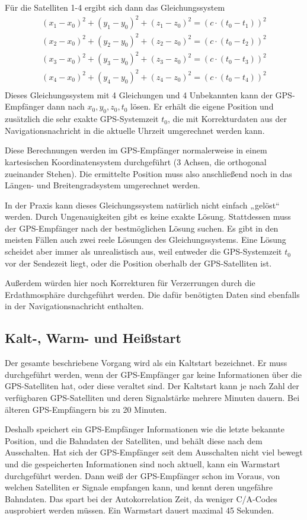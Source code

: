 \documentclass[12pt,a4paper]{scrartcl}
\begin{document}
Für die Satelliten 1-4 ergibt sich dann das Gleichungssystem
\begin{align*}
(x_1 - x_0)^2 + (y_1 - y_0)^2 + (z_1 - z_0)^2 = (c\cdot(t_0-t_1))^2 \\
(x_2 - x_0)^2 + (y_2 - y_0)^2 + (z_2 - z_0)^2 = (c\cdot(t_0-t_2))^2 \\
(x_3 - x_0)^2 + (y_3 - y_0)^2 + (z_3 - z_0)^2 = (c\cdot(t_0-t_3))^2 \\
(x_4 - x_0)^2 + (y_4 - y_0)^2 + (z_4 - z_0)^2 = (c\cdot(t_0-t_4))^2 \\
\end{align*}
Dieses Gleichungssystem mit 4 Gleichungen und 4 Unbekannten kann der GPS-Empfänger dann nach $x_0,y_0,z_0,t_0$ lösen. Er erhält die eigene Position und zusätzlich die sehr exakte GPS-Systemzeit $t_0$, die mit Korrekturdaten aus der Navigationsnachricht in die aktuelle Uhrzeit umgerechnet werden kann.

Diese Berechnungen werden im GPS-Empfänger normalerweise in einem kartesischen Koordinatensystem durchgeführt (3 Achsen, die orthogonal zueinander Stehen). Die ermittelte Position muss also anschließend noch in das Längen- und Breitengradsystem umgerechnet werden.

In der Praxis kann dieses Gleichungssystem natürlich nicht einfach „gelöst“ werden. Durch Ungenauigkeiten gibt es keine exakte Lösung. Stattdessen muss der GPS-Empfänger nach der bestmöglichen Lösung suchen. Es gibt in den meisten Fällen auch zwei reele Lösungen des Gleichungssystems. Eine Lösung scheidet aber immer als unrealistisch aus, weil entweder die GPS-Systemzeit $t_0$ vor der Sendezeit liegt, oder die Position oberhalb der GPS-Satelliten ist.

Außerdem würden hier noch Korrekturen für Verzerrungen durch die Erdathmosphäre durchgeführt werden. Die dafür benötigten Daten sind ebenfalls in der Navigationsnachricht enthalten.

\subsection{Kalt-, Warm- und Heißstart}
Der gesamte beschriebene Vorgang wird als ein Kaltstart bezeichnet. Er muss durchgeführt werden, wenn der GPS-Empfänger gar keine Informationen über die GPS-Satelliten hat, oder diese veraltet sind. Der Kaltstart kann je nach Zahl der verfügbaren GPS-Satelliten und deren Signalstärke mehrere Minuten dauern. Bei älteren GPS-Empfängern bis zu 20 Minuten.

Deshalb speichert ein GPS-Empfänger Informationen wie die letzte bekannte Position, und die Bahndaten der Satelliten, und behält diese nach dem Ausschalten. Hat sich der GPS-Empfänger seit dem Ausschalten nicht viel bewegt und die gespeicherten Informationen sind noch aktuell, kann ein Warmstart durchgeführt werden. Dann weiß der GPS-Empfänger schon im Voraus, von welchen Satelliten er Signale empfangen kann, und kennt deren ungefähre Bahndaten. Das spart bei der Autokorrelation Zeit, da weniger C/A-Codes ausprobiert werden müssen. Ein Warmstart dauert maximal 45 Sekunden.
\end{document}
